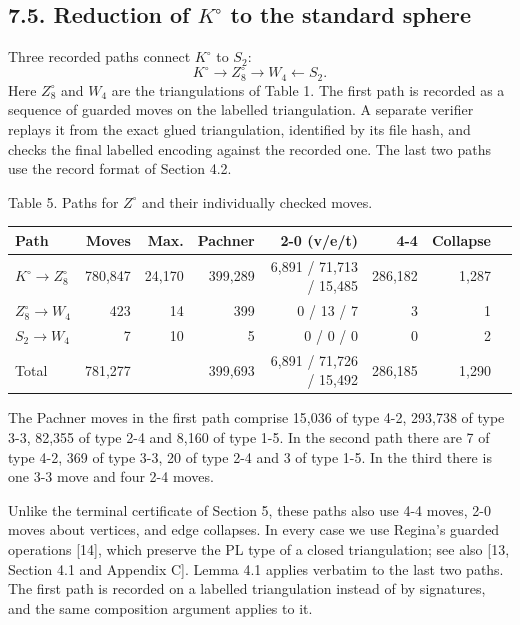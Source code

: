 \documentclass[11pt,letterpaper]{article}
\begin{document}
\subsection*{7.5. Reduction of $K^\circ$ to the standard sphere}
Three recorded paths connect $K^\circ$ to $S_2$:
\[
K^\circ\longrightarrow Z^\circ_8\longrightarrow W_4\longleftarrow S_2 .
\]
Here $Z^\circ_8$ and $W_4$ are the triangulations of Table 1. The first path is recorded as a sequence of guarded moves on the labelled triangulation. A separate verifier replays it from the exact glued triangulation, identified by its file hash, and checks the final labelled encoding against the recorded one. The last two paths use the record format of Section 4.2.

\noindent\begin{minipage}{\linewidth}
\begin{center}\small
Table 5. Paths for $Z^\circ$ and their individually checked moves.\par\smallskip
\begin{tabular}{lrrrrrrr}
\toprule
\textbf{Path} & \textbf{Moves} & \textbf{Max.} & \textbf{Pachner} & \textbf{2-0 (v/e/t)} & \textbf{4-4} & \textbf{Collapse} \\
\midrule
$K^\circ\to Z^\circ_8$ & 780,847 & 24,170 & 399,289 & 6,891 / 71,713 / 15,485 & 286,182 & 1,287 \\
$Z^\circ_8\to W_4$ & 423 & 14 & 399 & 0 / 13 / 7 & 3 & 1 \\
$S_2\to W_4$ & 7 & 10 & 5 & 0 / 0 / 0 & 0 & 2 \\
\midrule
Total & 781,277 &  & 399,693 & 6,891 / 71,726 / 15,492 & 286,185 & 1,290 \\
\bottomrule
\end{tabular}
\end{center}
\end{minipage}\par\smallskip
The Pachner moves in the first path comprise 15,036 of type 4-2, 293,738 of type 3-3, 82,355 of type 2-4 and 8,160 of type 1-5. In the second path there are 7 of type 4-2, 369 of type 3-3, 20 of type 2-4 and 3 of type 1-5. In the third there is one 3-3 move and four 2-4 moves.

Unlike the terminal certificate of Section 5, these paths also use 4-4 moves, 2-0 moves about vertices, and edge collapses. In every case we use Regina's guarded operations [14], which preserve the PL type of a closed triangulation; see also [13, Section 4.1 and Appendix C]. Lemma 4.1 applies verbatim to the last two paths. The first path is recorded on a labelled triangulation instead of by signatures, and the same composition argument applies to it.
\end{document}
